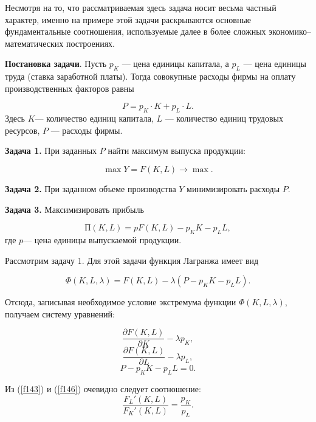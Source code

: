 \documentclass[12pt,openbib]{report}
\begin{document}
Несмотря на то, что рассматриваемая здесь задача носит весьма
частный характер, именно на примере этой задачи раскрываются
основные фундаментальные соотношения, используемые далее в более
сложных экономико--математических построениях.

{\bf Постановка задачи}. Пусть $p_K$ --- цена единицы капитала, а
$p_L$ --- цена единицы труда (ставка заработной платы). Тогда
совокупные расходы фирмы на оплату производственных факторов равны

\begin{equation}\label{f141}
P=p_K\cdot K+p_L\cdot L.
\end{equation}
Здесь $K$--- количество
единиц капитала, $L$ --- количество единиц трудовых ресурсов, $P$ ---
расходы фирмы.

{\bf Задача 1.} При заданных $P$ найти максимум выпуска продукции:

\begin{equation}\label{f142}
\max Y=F(K,L)\to\max.
\end{equation}

{\bf Задача 2.} При заданном объеме производства $Y$ минимизировать
расходы $P$.

{\bf Задача 3.} Максимизировать прибыль

\begin{equation}\label{f143}
\mbox{П}(K,L)=pF(K,L)-p_K
K-p_L L,
\end{equation}
 где $p$--- цена единицы выпускаемой
продукции.

Рассмотрим задачу 1. Для этой задачи функция Лагранжа
имеет вид

\begin{equation}\label{f144}
\Phi(K,L,\lambda)=F(K,L)-\lambda(P-p_K
K-p_LL).
\end{equation}

Отсюда, записывая необходимое условие экстремума функции
$\Phi(K,L,\lambda)$, получаем систему уравнений:

\begin{equation}\label{f145}
\frac{\partial F(K,L)}{\partial K}-\lambda p_K,
\end{equation}
\begin{equation}\label{f146}
\frac{\partial F(K,L)}{\partial L}-\lambda p_L,
\end{equation}
\begin{equation}\label{f147}
P-p_KK-p_LL=0.
\end{equation}

Из (\ref{f143}) и (\ref{f146}) очевидно следует соотношение:
\begin{equation}\label{f148}
\frac{F_L'(K,L)}{F_K'(K,L)}=\frac{p_K}{p_L}.
\end{equation}
\end{document}
